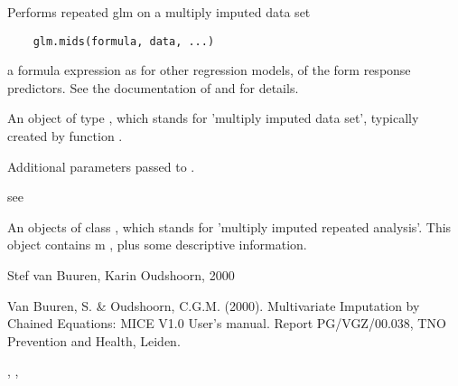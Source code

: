 \begin{Description}\relax
Performs repeated glm on a multiply imputed data set
\end{Description}
\begin{Usage}
\begin{verbatim}
    glm.mids(formula, data, ...)
\end{verbatim}
\end{Usage}
\begin{Arguments}
\begin{ldescription}
\item[\code{formula}] a formula expression as for other regression models, of the form 
response ~ predictors. See the documentation
of  and  for details.
\item[\code{data}] An object of type , which stands for 'multiply imputed data set', typically
created by function .
\item[\code{...}] Additional parameters passed to .
\end{ldescription}
\end{Arguments}
\begin{Details}\relax
see 
\end{Details}
\begin{Value}
An objects of class , which stands for 'multiply imputed repeated analysis'.
This object contains m , plus some descriptive information.
\end{Value}
\begin{Author}\relax
Stef van Buuren, Karin Oudshoorn, 2000
\end{Author}
\begin{References}\relax
Van Buuren, S. \& Oudshoorn, C.G.M. (2000). Multivariate Imputation by Chained Equations: 
MICE V1.0 User's manual. Report PG/VGZ/00.038, TNO Prevention and Health, Leiden.
\end{References}
\begin{SeeAlso}\relax
{},  , 
\end{SeeAlso}
